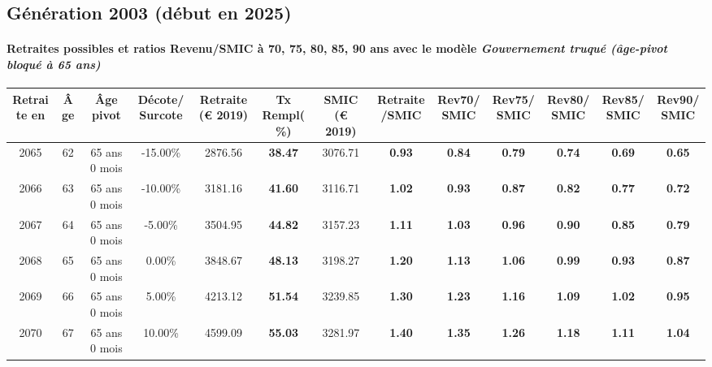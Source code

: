 \newpage 
 
\subsection{Génération 2003 (début en 2025)} 

\paragraph{Retraites possibles et ratios Revenu/SMIC à 70, 75, 80, 85, 90 ans avec le modèle \emph{Gouvernement truqué (âge-pivot bloqué à 65 ans)}}  
 
{ \scriptsize \begin{center} 
\begin{tabular}[htb]{|c|c||c|c||c|c||c||c|c|c|c|c|c|} 
\hline 
 Retraite en &  Âge &  Âge pivot &  Décote/Surcote &  Retraite (\euro{} 2019) &  Tx Rempl(\%) &  SMIC (\euro{} 2019) &  Retraite/SMIC &  Rev70/SMIC &  Rev75/SMIC &  Rev80/SMIC &  Rev85/SMIC &  Rev90/SMIC \\ 
\hline \hline 
 2065 &  62 &  65 ans 0 mois &  -15.00\% &  2876.56 &  {\bf 38.47} &  3076.71 &  {\bf {\color{red} 0.93}} &  {\bf {\color{red} 0.84}} &  {\bf {\color{red} 0.79}} &  {\bf {\color{red} 0.74}} &  {\bf {\color{red} 0.69}} &  {\bf {\color{red} 0.65}} \\ 
\hline 
 2066 &  63 &  65 ans 0 mois &  -10.00\% &  3181.16 &  {\bf 41.60} &  3116.71 &  {\bf 1.02} &  {\bf {\color{red} 0.93}} &  {\bf {\color{red} 0.87}} &  {\bf {\color{red} 0.82}} &  {\bf {\color{red} 0.77}} &  {\bf {\color{red} 0.72}} \\ 
\hline 
 2067 &  64 &  65 ans 0 mois &  -5.00\% &  3504.95 &  {\bf 44.82} &  3157.23 &  {\bf 1.11} &  {\bf 1.03} &  {\bf {\color{red} 0.96}} &  {\bf {\color{red} 0.90}} &  {\bf {\color{red} 0.85}} &  {\bf {\color{red} 0.79}} \\ 
\hline 
 2068 &  65 &  65 ans 0 mois &  0.00\% &  3848.67 &  {\bf 48.13} &  3198.27 &  {\bf 1.20} &  {\bf 1.13} &  {\bf 1.06} &  {\bf {\color{red} 0.99}} &  {\bf {\color{red} 0.93}} &  {\bf {\color{red} 0.87}} \\ 
\hline 
 2069 &  66 &  65 ans 0 mois &  5.00\% &  4213.12 &  {\bf 51.54} &  3239.85 &  {\bf 1.30} &  {\bf 1.23} &  {\bf 1.16} &  {\bf 1.09} &  {\bf 1.02} &  {\bf {\color{red} 0.95}} \\ 
\hline 
 2070 &  67 &  65 ans 0 mois &  10.00\% &  4599.09 &  {\bf 55.03} &  3281.97 &  {\bf 1.40} &  {\bf 1.35} &  {\bf 1.26} &  {\bf 1.18} &  {\bf 1.11} &  {\bf 1.04} \\ 
\hline 
\hline 
\end{tabular} 
\end{center} } 
